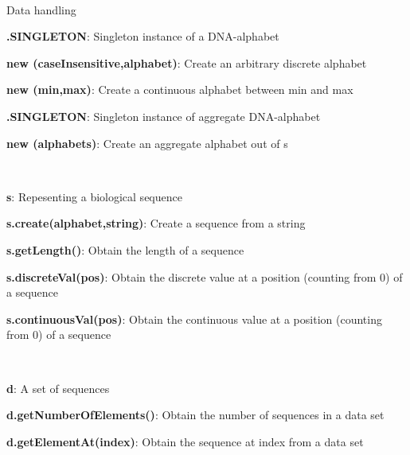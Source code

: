 \documentclass[10pt]{scrartcl}
\newcommand{\entry}[3]{{\bfseries #1#2}: #3}
\begin{document}
\thispagestyle{empty}


\renewcommand{\section}[1]{{
~\vspace{-0.1cm}

\large\sfb #1\vspace{0.1cm}\\}


}
\begin{flushleft}
\footnotesize
\section{Data handling}

\entry{\DNAAlphabet}{.SINGLETON}{Singleton instance of a DNA-alphabet}

\entry{new \DiscreteAlphabet}{(caseInsensitive,alphabet)}{Create an arbitrary discrete alphabet}

\entry{new \ContinuousAlphabet}{(min,max)}{Create a continuous alphabet between min and max}

\entry{\DNAAlphabetContainer}{.SINGLETON}{Singleton instance of aggregate DNA-alphabet}

\entry{new \AlphabetContainer}{(alphabets)}{Create an aggregate alphabet out of \Alphabet s}

~

\entry{\Sequence}{ s}{Repesenting a biological sequence}

\entry{s}{.create(alphabet,string)}{Create a sequence from a string}

\entry{s}{.getLength()}{Obtain the length of a sequence}

\entry{s}{.discreteVal(pos)}{Obtain the discrete value at a position (counting from 0) of a sequence}

\entry{s}{.continuousVal(pos)}{Obtain the continuous value at a position (counting from 0) of a sequence}

~

\entry{\DataSet}{ d}{A set of sequences}

\entry{d}{.getNumberOfElements()}{Obtain the number of sequences in a data set}

\entry{d}{.getElementAt(index)}{Obtain the sequence at index from a data set}


\end{flushleft}
\end{document}

